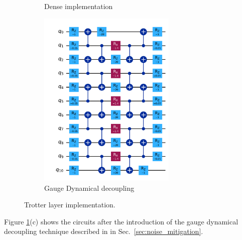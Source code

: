 \documentclass[a4paper]{article}
\begin{document}
\begin{figure}
\begin{subfigure}[bl]{0.3\textwidth}
        \caption{Dense implementation}
    \end{subfigure}
    \begin{subfigure}[position]{0.3\textwidth}
        \centering
        \includegraphics[width=0.72\textwidth]{second_order_trotter_gauge.pdf}
        \caption{Gauge Dynamical decoupling}
    \end{subfigure}
    \caption{Trotter layer implementation.}
    \label{fig:circs}
\end{figure}

Figure \ref{fig:circs}(c) shows the circuits after the introduction of the gauge dynamical decoupling technique described in in Sec.~\ref{sec:noise_mitigation}.

\end{document}
